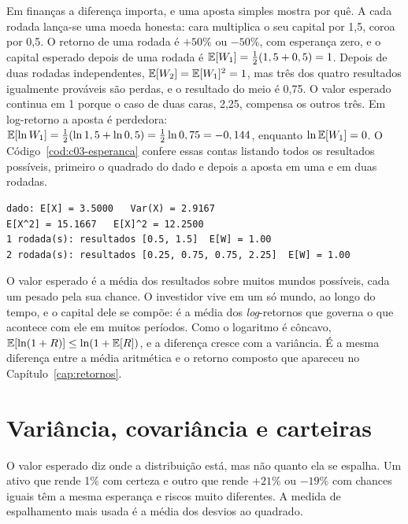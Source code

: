 Em finanças a diferença importa, e uma aposta simples mostra por quê. A cada rodada lança-se uma moeda honesta: cara multiplica o seu capital por 1,5, coroa por 0,5. O retorno de uma rodada é $+50\%$ ou $-50\%$, com esperança zero, e o capital esperado depois de uma rodada é $\operatorname{\mathbb{E}}[W_1] = \frac{1}{2}(1,5 + 0,5) = 1$. Depois de duas rodadas independentes, $\operatorname{\mathbb{E}}[W_2] = \operatorname{\mathbb{E}}[W_1]^2 = 1$, mas três dos quatro resultados igualmente prováveis são perdas, e o resultado do meio é 0,75. O valor esperado continua em 1 porque o caso de duas caras, 2,25, compensa os outros três. Em log-retorno a aposta é perdedora: $\operatorname{\mathbb{E}}[\ln W_1] = \frac{1}{2}(\ln 1,5 + \ln 0,5) = \frac{1}{2}\ln 0,75 = -0,144$, enquanto $\ln \operatorname{\mathbb{E}}[W_1] = 0$. O Código~\ref{cod:c03-esperanca} confere essas contas listando todos os resultados possíveis, primeiro o quadrado do dado e depois a aposta em uma e em duas rodadas.


\begin{lstlisting}[style=saida]
dado: E[X] = 3.5000   Var(X) = 2.9167
E[X^2] = 15.1667   E[X]^2 = 12.2500
1 rodada(s): resultados [0.5, 1.5]  E[W] = 1.00
2 rodada(s): resultados [0.25, 0.75, 0.75, 2.25]  E[W] = 1.00
\end{lstlisting}

\begin{intuicao}
O valor esperado é a média dos resultados sobre muitos mundos possíveis, cada um pesado pela sua chance. O investidor vive em um só mundo, ao longo do tempo, e o capital dele se compõe: é a média dos \emph{log}-retornos que governa o que acontece com ele em muitos períodos. Como o logaritmo é côncavo, $\operatorname{\mathbb{E}}[\ln(1+R)] \le \ln(1 + \operatorname{\mathbb{E}}[R])$, e a diferença cresce com a variância. É a mesma diferença entre a média aritmética e o retorno composto que apareceu no Capítulo~\ref{cap:retornos}.
\end{intuicao}

\section{Variância, covariância e carteiras}
\label{sec:c03-variancia}

O valor esperado diz onde a distribuição está, mas não quanto ela se espalha. Um ativo que rende 1\% com certeza e outro que rende $+21\%$ ou $-19\%$ com chances iguais têm a mesma esperança e riscos muito diferentes. A medida de espalhamento mais usada é a média dos desvios ao quadrado.

